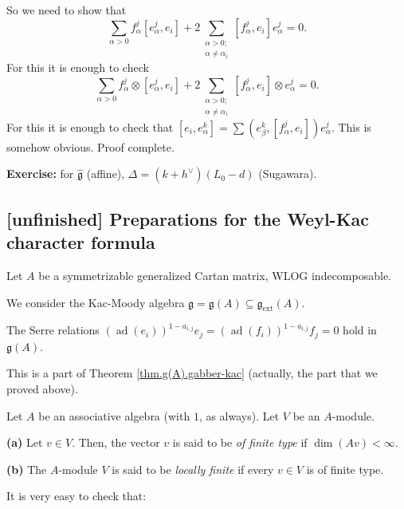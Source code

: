 \documentclass[etingof-lie.tex]{subfiles}
\begin{document}
So we need to show that%
\[
\sum\limits_{\alpha>0}f_{\alpha}^{j}\left[  e_{\alpha}^{j},e_{i}\right]
+2\sum\limits_{\substack{\alpha>0;\\\alpha\neq\alpha_{i}}}\left[  f_{\alpha
}^{j},e_{i}\right]  e_{\alpha}^{j}=0.
\]
For this it is enough to check%
\[
\sum\limits_{\alpha>0}f_{\alpha}^{j}\otimes\left[  e_{\alpha}^{j}%
,e_{i}\right]  +2\sum\limits_{\substack{\alpha>0;\\\alpha\neq\alpha_{i}%
}}\left[  f_{\alpha}^{j},e_{i}\right]  \otimes e_{\alpha}^{j}=0.
\]
For this it is enough to check that $\left[  e_{i},e_{\alpha}^{k}\right]
=\sum\left(  e_{\beta}^{k},\left[  f_{\alpha}^{j},e_{i}\right]  \right)
e_{\alpha}^{j}$. This is somehow obvious. Proof complete.

\textbf{Exercise:} for $\widehat{\mathfrak{g}}$ (affine), $\Delta=\left(
k+h^{\vee}\right)  \left(  L_{0}-d\right)  $ (Sugawara).

\subsection{\textbf{[unfinished]} Preparations for the Weyl-Kac character
formula}

Let $A$ be a symmetrizable generalized Cartan matrix, WLOG indecomposable.

We consider the Kac-Moody algebra $\mathfrak{g}=\mathfrak{g}\left(  A\right)
\subseteq\mathfrak{g}_{\operatorname*{ext}}\left(  A\right)  $.

\begin{proposition}
The Serre relations $\left(  \operatorname*{ad}\left(  e_{i}\right)  \right)
^{1-a_{i,j}}e_{j}=\left(  \operatorname*{ad}\left(  f_{i}\right)  \right)
^{1-a_{i,j}}f_{j}=0$ hold in $\mathfrak{g}\left(  A\right)  $.
\end{proposition}

This is a part of Theorem \ref{thm.g(A).gabber-kac} (actually, the part that
we proved above).

\begin{definition}
Let $A$ be an associative algebra (with $1$, as always). Let $V$ be an $A$-module.

\textbf{(a)} Let $v\in V$. Then, the vector $v$ is said to be \textit{of
finite type} if $\dim\left(  Av\right)  <\infty$.

\textbf{(b)} The $A$-module $V$ is said to be \textit{locally finite} if every
$v\in V$ is of finite type.
\end{definition}

It is very easy to check that:
\end{document}
